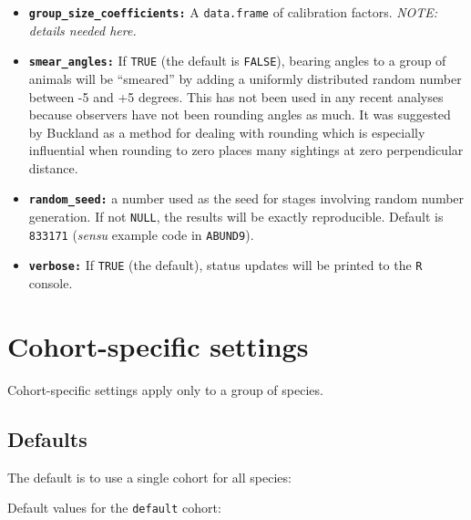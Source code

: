 \documentclass[
]{book}
\newenvironment{Shaded}{\begin{snugshade}}{\end{snugshade}}
\newcommand{\DecValTok}[1]{\textcolor[rgb]{0.00,0.00,0.81}{#1}}
\newcommand{\NormalTok}[1]{#1}
\newcommand{\OperatorTok}[1]{\textcolor[rgb]{0.81,0.36,0.00}{\textbf{#1}}}
\newcommand{\StringTok}[1]{\textcolor[rgb]{0.31,0.60,0.02}{#1}}
\begin{document}
\begin{itemize}
\item
  \textbf{\texttt{group\_size\_coefficients:}} A \texttt{data.frame} of calibration factors. \emph{NOTE: details needed here.}
\item
  \textbf{\texttt{smear\_angles:}} If \texttt{TRUE} (the default is \texttt{FALSE}), bearing angles to a group of animals will be ``smeared'' by adding a uniformly distributed random number between -5 and +5 degrees. This has not been used in any recent analyses because observers have not been rounding angles as much. It was suggested by Buckland as a method for dealing with rounding which is especially influential when rounding to zero places many sightings at zero perpendicular distance.
\item
  \textbf{\texttt{random\_seed:}} a number used as the seed for stages involving random number generation. If not \texttt{NULL}, the results will be exactly reproducible. Default is \texttt{833171} (\emph{sensu} example code in \texttt{ABUND9}).
\item
  \textbf{\texttt{verbose:}} If \texttt{TRUE} (the default), status updates will be printed to the \texttt{R} console.
\end{itemize}

\hypertarget{cohort-specific-settings}{%
\section*{Cohort-specific settings}\label{cohort-specific-settings}}

Cohort-specific settings apply only to a group of species.

\hypertarget{defaults-1}{%
\subsection*{Defaults}\label{defaults-1}}

The default is to use a single cohort for all species:

\begin{Shaded}
\end{Shaded}

Default values for the \texttt{default} cohort:
\end{document}
